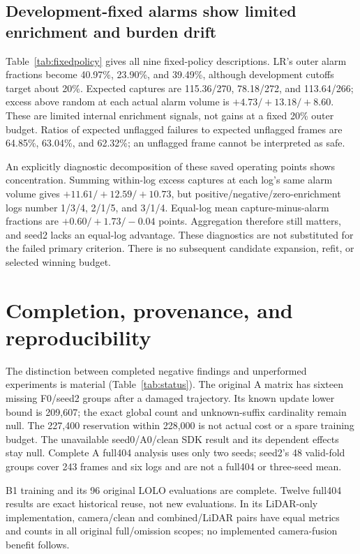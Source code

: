 \documentclass[conference]{IEEEtran}
\begin{document}
\subsection{Development-fixed alarms show limited enrichment and burden drift}
Table~\ref{tab:fixedpolicy} gives all nine fixed-policy descriptions. LR's outer alarm fractions become 40.97\%, 23.90\%, and 39.49\%, although development cutoffs target about 20\%. Expected captures are 115.36/270, 78.18/272, and 113.64/266; excess above random at each actual alarm volume is $+4.73/+13.18/+8.60$. These are limited internal enrichment signals, not gains at a fixed 20\% outer budget. Ratios of expected unflagged failures to expected unflagged frames are 64.85\%, 63.04\%, and 62.32\%; an unflagged frame cannot be interpreted as safe.

An explicitly diagnostic decomposition of these saved operating points shows concentration. Summing within-log excess captures at each log's same alarm volume gives $+11.61/+12.59/+10.73$, but positive/negative/zero-enrichment logs number 1/3/4, 2/1/5, and 3/1/4. Equal-log mean capture-minus-alarm fractions are $+0.60/+1.73/-0.04$ points. Aggregation therefore still matters, and seed2 lacks an equal-log advantage. These diagnostics are not substituted for the failed primary criterion. There is no subsequent candidate expansion, refit, or selected winning budget.


\section{Completion, provenance, and reproducibility}
The distinction between completed negative findings and unperformed experiments is material (Table~\ref{tab:status}). The original A matrix has sixteen missing F0/seed2 groups after a damaged trajectory. Its known update lower bound is 209,607; the exact global count and unknown-suffix cardinality remain null. The 227,400 reservation within 228,000 is not actual cost or a spare training budget. The unavailable seed0/A0/clean SDK result and its dependent effects stay null. Complete A full404 analysis uses only two seeds; seed2's 48 valid-fold groups cover 243 frames and six logs and are not a full404 or three-seed mean.

B1 training and its 96 original LOLO evaluations are complete. Twelve full404 results are exact historical reuse, not new evaluations. In its LiDAR-only implementation, camera/clean and combined/LiDAR pairs have equal metrics and counts in all original full/omission scopes; no implemented camera-fusion benefit follows.
\end{document}
